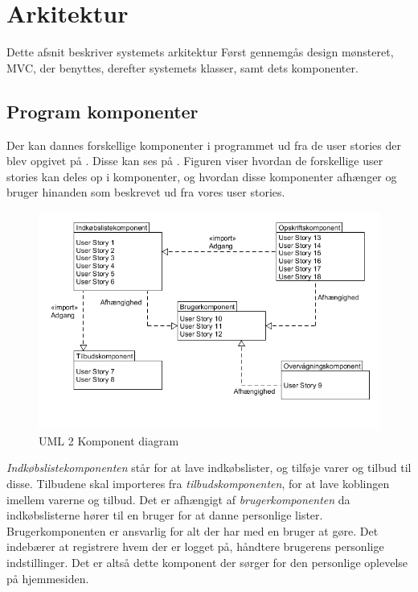 \section{Arkitektur}
Dette afsnit beskriver systemets arkitektur
Først gennemgås design mønsteret, MVC, der benyttes, derefter systemets klasser, samt dets komponenter.



\subsection{Program komponenter}\label{subsec:komp}

Der kan dannes forskellige komponenter i programmet ud fra de user stories der blev opgivet på .
Disse kan ses på .
Figuren viser hvordan de forskellige user stories kan deles op i komponenter, og hvordan disse komponenter afhænger og bruger hinanden som beskrevet ud fra vores user stories.

\begin{figure}
	\vspace{-20pt}
	\begin{center}
		\includegraphics[scale=0.6]{images/Diagrams/Komponenter.png}
	\end{center}
	\vspace{-20pt}
	\caption{UML 2 Komponent diagram }
	\label{figure:komp}
	\vspace{-20pt}
\end{figure}

\textit{Indkøbslistekomponenten} står for at lave indkøbslister, og tilføje varer og tilbud til disse.
Tilbudene skal importeres fra \textit{tilbudskomponenten}, for at lave koblingen imellem varerne og tilbud.
Det er afhængigt af \textit{brugerkomponenten} da indkøbslisterne hører til en bruger for at danne personlige lister. Brugerkomponenten er ansvarlig for alt der har med en bruger at gøre. Det indebærer at registrere hvem der er logget på, håndtere brugerens personlige indstillinger. Det er altså dette komponent der sørger for den personlige oplevelse på hjemmesiden.

